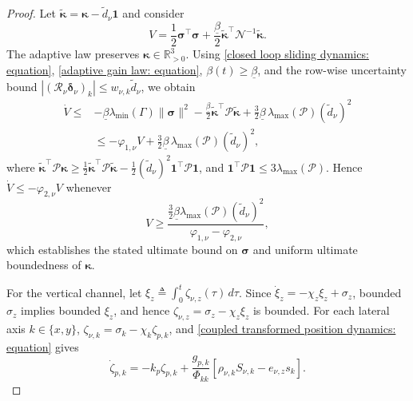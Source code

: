 \documentclass[10pt,conference]{IEEEtran}
\begin{document}
\begin{proof}
Let $\widetilde{\boldsymbol\kappa}=\boldsymbol\kappa-\tilde d_\nu\boldsymbol1$ and consider
\begin{equation}
    V = \frac{1}{2}\boldsymbol\sigma^\top\boldsymbol\sigma + \frac{\underline\beta}{2}\widetilde{\boldsymbol\kappa}^{\top} \mathcal N^{-1}\widetilde{\boldsymbol\kappa}.
    \label{translational Lyapunov: equation}
\end{equation}
The adaptive law preserves $\boldsymbol\kappa\in\mathbb R_{>0}^3$.
Using \eqref{closed loop sliding dynamics: equation}, \eqref{adaptive gain law: equation}, $\beta(t)\ge\underline\beta$, and the row-wise uncertainty bound $|(\mathcal R_\nu\boldsymbol\delta_\nu)_k| \le w_{\nu,k}\tilde d_\nu$, we obtain
\begin{align}
    \dot V \le{}& -\underline\beta\lambda_{\min}(\Gamma)  \|\boldsymbol\sigma\|^2 -\frac{\underline\beta}{2}  \widetilde{\boldsymbol\kappa}^{\top}  \mathcal P\widetilde{\boldsymbol\kappa} + \frac{3}{2} \underline\beta\,\lambda_{\max}(\mathcal P)(\tilde d_\nu)^2 \nonumber\\
    &\le -\varphi_{1,\nu}V + \frac{3}{2} \underline\beta\,\lambda_{\max}(\mathcal P)(\tilde d_\nu)^2,
    \label{translational Vdot bound: equation}
\end{align}
where $\widetilde{\boldsymbol\kappa}^{\top}\mathcal P\boldsymbol\kappa \ge \frac12 \widetilde{\boldsymbol\kappa}^{\top} \mathcal P\widetilde{\boldsymbol\kappa} - \frac12(\tilde d_\nu)^2 \boldsymbol1^\top\mathcal P\boldsymbol1$, and $\boldsymbol1^\top\mathcal P\boldsymbol1 \le 3\lambda_{\max}(\mathcal P)$.
Hence $\dot V\le-\varphi_{2,\nu}V$ whenever
\begin{equation*}
    V \ge \frac{\tfrac{3}{2} \underline\beta\lambda_{\max}(\mathcal P)(\tilde d_\nu)^2}{\varphi_{1,\nu}-\varphi_{2,\nu}},
\end{equation*}
which establishes the stated ultimate bound on $\boldsymbol\sigma$ and uniform ultimate boundedness of $\boldsymbol\kappa$.

For the vertical channel, let $\xi_z \triangleq \int_0^t \zeta_{\nu,z}(\tau)\,d\tau$. Since $\dot{\xi}_z = -\chi_z\xi_z+\sigma_z$, bounded $\sigma_z$ implies bounded $\xi_z$, and hence $\zeta_{\nu,z}=\sigma_z-\chi_z\xi_z$ is bounded.
For each lateral axis $k\in\{x,y\}$,
$\zeta_{\nu,k}=\sigma_k-\chi_k\zeta_{p,k}$, and
\eqref{coupled transformed position dynamics: equation} gives
\begin{equation}
    \dot{\zeta}_{p,k} = -k_p\zeta_{p,k} + \frac{g_{p,k}}{\Phi_{kk}} \left[\rho_{\nu,k}S_{\nu,k} -e_{\nu,z}s_k \right].
    \label{reduced position transformed dynamics: equation}
\end{equation}


\end{proof}
\end{document}
